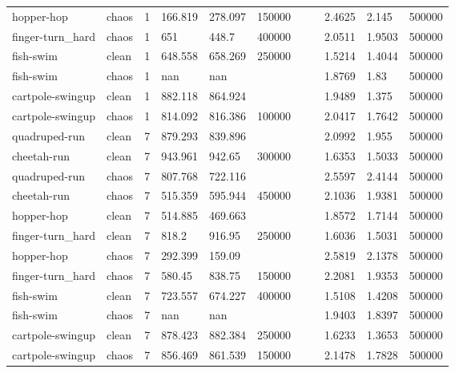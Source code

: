 \begin{tabular}{lllllllllll}
hopper-hop & chaos & 1 & 166.819 & 278.097 & 150000 &  &  & 2.4625 & 2.145 & 500000 \\
finger-turn\_hard & chaos & 1 & 651 & 448.7 & 400000 &  &  & 2.0511 & 1.9503 & 500000 \\
fish-swim & clean & 1 & 648.558 & 658.269 & 250000 &  &  & 1.5214 & 1.4044 & 500000 \\
fish-swim & chaos & 1 & nan & nan &  &  &  & 1.8769 & 1.83 & 500000 \\
cartpole-swingup & clean & 1 & 882.118 & 864.924 &  &  &  & 1.9489 & 1.375 & 500000 \\
cartpole-swingup & chaos & 1 & 814.092 & 816.386 & 100000 &  &  & 2.0417 & 1.7642 & 500000 \\
quadruped-run & clean & 7 & 879.293 & 839.896 &  &  &  & 2.0992 & 1.955 & 500000 \\
cheetah-run & clean & 7 & 943.961 & 942.65 & 300000 &  &  & 1.6353 & 1.5033 & 500000 \\
quadruped-run & chaos & 7 & 807.768 & 722.116 &  &  &  & 2.5597 & 2.4144 & 500000 \\
cheetah-run & chaos & 7 & 515.359 & 595.944 & 450000 &  &  & 2.1036 & 1.9381 & 500000 \\
hopper-hop & clean & 7 & 514.885 & 469.663 &  &  &  & 1.8572 & 1.7144 & 500000 \\
finger-turn\_hard & clean & 7 & 818.2 & 916.95 & 250000 &  &  & 1.6036 & 1.5031 & 500000 \\
hopper-hop & chaos & 7 & 292.399 & 159.09 &  &  &  & 2.5819 & 2.1378 & 500000 \\
finger-turn\_hard & chaos & 7 & 580.45 & 838.75 & 150000 &  &  & 2.2081 & 1.9353 & 500000 \\
fish-swim & clean & 7 & 723.557 & 674.227 & 400000 &  &  & 1.5108 & 1.4208 & 500000 \\
fish-swim & chaos & 7 & nan & nan &  &  &  & 1.9403 & 1.8397 & 500000 \\
cartpole-swingup & clean & 7 & 878.423 & 882.384 & 250000 &  &  & 1.6233 & 1.3653 & 500000 \\
cartpole-swingup & chaos & 7 & 856.469 & 861.539 & 150000 &  &  & 2.1478 & 1.7828 & 500000 \\
\bottomrule
\end{tabular}
